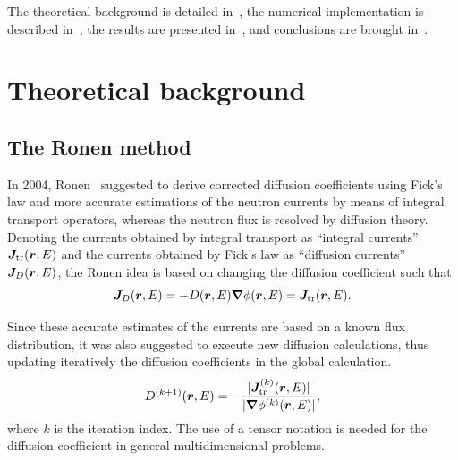 
The theoretical background is detailed in~, the numerical implementation is described in~, the results are presented in~, and conclusions are brought in~.

%
\section{Theoretical background}
\label{sec:theory}

%
\subsection{The Ronen method}
\label{sec:RM}

In 2004, Ronen~\cite{Ronen-2004} suggested to derive corrected diffusion coefficients using Fick's law and more accurate estimations of the neutron currents by means of integral transport operators, whereas the neutron flux is resolved by diffusion theory. Denoting the currents obtained by integral transport as ``integral currents'' $\bm{J}_{\textrm{\scriptsize{tr}}}(\bm{r},E)$ and the currents obtained by Fick's law as ``diffusion currents'' $\bm{J}_D(\bm{r},E)$, the Ronen idea is based on changing the diffusion coefficient such that
\begin{equation}\label{eq:Fick}
\bm{J}_D(\bm{r},E) = -D(\bm{r},E)\bm{\nabla}\phi(\bm{r},E) = \bm{J}_{\textrm{\scriptsize{tr}}}(\bm{r},E). 
\end{equation}

Since these accurate estimates of the currents are based on a known flux distribution, it was also suggested to execute new diffusion calculations, thus updating iteratively the diffusion coefficients in the global calculation. 
\begin{equation}\label{eq:RM-it}
D^{(k+1)}(\bm{r},E) = -\frac{\lvert\bm{J}_{\textrm{\scriptsize{tr}}}^{(k)}(\bm{r},E)\rvert}{\lvert\bm{\nabla}\phi^{(k)}(\bm{r},E)\rvert} ,
\end{equation}
where $k$ is the iteration index. The use of a tensor notation is needed for the diffusion coefficient in general multidimensional problems.

